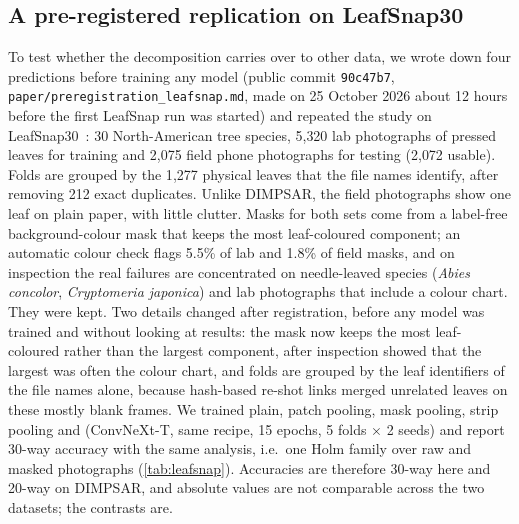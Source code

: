 \begin{table}[t]
\centering
\caption{Standard vs.\ strong (background compositing + blur + noise) augmentation, ConvNeXt-T,
5 folds $\times$ 3 seeds, \%. MedLeaf-C: seed 0.}
\label{tab:strongaug}
\small

\end{table}

\subsection{A pre-registered replication on LeafSnap30}
\label{sec:leafsnap}
To test whether the decomposition carries over to other data, we wrote down four predictions before
training any model (public commit \texttt{90c47b7}, \texttt{paper/preregistration\_leafsnap.md},
made on 25 October 2026 about 12 hours before the first LeafSnap run was started) and
repeated the study on LeafSnap30~\citep{leafsnap30,kumar2012leafsnap}: 30 North-American tree species,
5{,}320 lab photographs of pressed leaves for training and 2{,}075 field phone photographs for testing
(2{,}072 usable). Folds are grouped by the 1{,}277 physical leaves that the file names identify, after
removing 212 exact duplicates. Unlike DIMPSAR, the field photographs show one leaf on plain paper,
with little clutter. Masks for both sets come from a label-free background-colour mask that keeps the
most leaf-coloured component; an automatic colour check flags 5.5\% of lab and 1.8\% of field masks,
and on inspection the real failures are concentrated on needle-leaved species (\textit{Abies concolor},
\textit{Cryptomeria japonica}) and lab photographs that include a colour chart. They were kept. Two
details changed after registration, before any model was trained and without looking at results:
the mask now keeps the most leaf-coloured rather than the largest component, after inspection showed
that the largest was often the colour chart, and folds are grouped by the leaf identifiers of the file
names alone, because hash-based re-shot links merged unrelated leaves on these mostly blank frames. We trained plain, patch pooling, mask pooling, strip pooling and \SVA{} (ConvNeXt-T,
same recipe, 15 epochs, 5 folds $\times$ 2 seeds) and report 30-way accuracy with the same analysis, i.e.\ one Holm family over raw and masked photographs
(\cref{tab:leafsnap}). Accuracies are therefore 30-way here and 20-way on DIMPSAR, and absolute values
are not comparable across the two datasets; the contrasts are.

